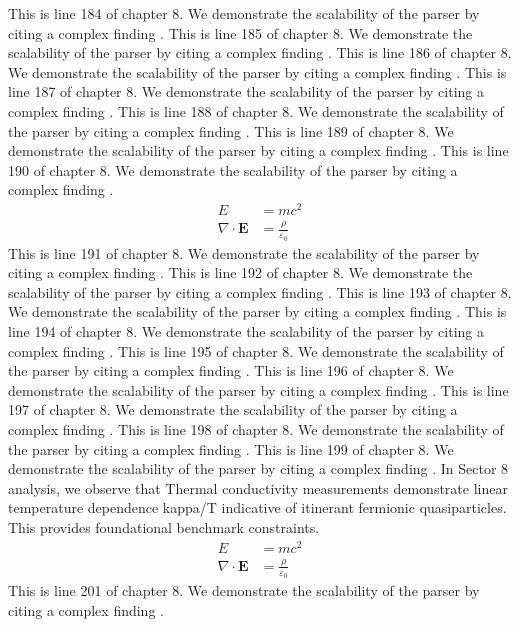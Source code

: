This is line 184 of chapter 8. We demonstrate the scalability of the parser by citing a complex finding \cite{ref8_184}.
This is line 185 of chapter 8. We demonstrate the scalability of the parser by citing a complex finding \cite{ref8_185}.
This is line 186 of chapter 8. We demonstrate the scalability of the parser by citing a complex finding \cite{ref8_186}.
This is line 187 of chapter 8. We demonstrate the scalability of the parser by citing a complex finding \cite{ref8_187}.
This is line 188 of chapter 8. We demonstrate the scalability of the parser by citing a complex finding \cite{ref8_188}.
This is line 189 of chapter 8. We demonstrate the scalability of the parser by citing a complex finding \cite{ref8_189}.
This is line 190 of chapter 8. We demonstrate the scalability of the parser by citing a complex finding \cite{ref8_190}.
\begin{align*}
  E &= mc^2 \\
  \nabla \cdot \mathbf{E} &= \frac{\rho}{\varepsilon_0}
\end{align*}
This is line 191 of chapter 8. We demonstrate the scalability of the parser by citing a complex finding \cite{ref8_191}.
This is line 192 of chapter 8. We demonstrate the scalability of the parser by citing a complex finding \cite{ref8_192}.
This is line 193 of chapter 8. We demonstrate the scalability of the parser by citing a complex finding \cite{ref8_193}.
This is line 194 of chapter 8. We demonstrate the scalability of the parser by citing a complex finding \cite{ref8_194}.
This is line 195 of chapter 8. We demonstrate the scalability of the parser by citing a complex finding \cite{ref8_195}.
This is line 196 of chapter 8. We demonstrate the scalability of the parser by citing a complex finding \cite{ref8_196}.
This is line 197 of chapter 8. We demonstrate the scalability of the parser by citing a complex finding \cite{ref8_197}.
This is line 198 of chapter 8. We demonstrate the scalability of the parser by citing a complex finding \cite{ref8_198}.
This is line 199 of chapter 8. We demonstrate the scalability of the parser by citing a complex finding \cite{ref8_199}.
In Sector 8 analysis, we observe that Thermal conductivity measurements demonstrate linear temperature dependence kappa/T indicative of itinerant fermionic quasiparticles. This provides foundational benchmark constraints.
\begin{align*}
  E &= mc^2 \\
  \nabla \cdot \mathbf{E} &= \frac{\rho}{\varepsilon_0}
\end{align*}
This is line 201 of chapter 8. We demonstrate the scalability of the parser by citing a complex finding \cite{ref8_201}.
